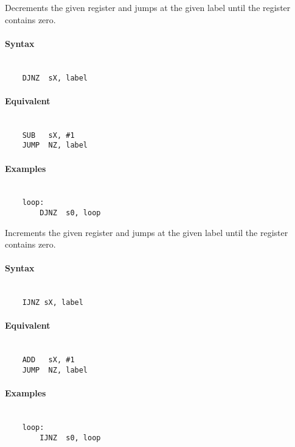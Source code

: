     Decrements the given register and jumps at the given label until the register contains zero.

    \paragraph{Syntax}
        ~\\
        \verb'    DJNZ  sX, label'

    \paragraph{Equivalent}
        ~\\
        \verb'    SUB   sX, #1'\\
        \verb'    JUMP  NZ, label'

    \paragraph{Examples}
        ~\\
        \verb'    loop:             '\\
        \verb'        DJNZ  s0, loop'

    Increments the given register and jumps at the given label until the register contains zero.

    \paragraph{Syntax}
        ~\\
        \verb'    IJNZ sX, label'

    \paragraph{Equivalent}
        ~\\
        \verb'    ADD   sX, #1'\\
        \verb'    JUMP  NZ, label'

    \paragraph{Examples}
        ~\\
        \verb'    loop:             '\\
        \verb'        IJNZ  s0, loop'
